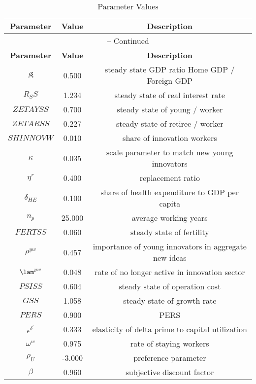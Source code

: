 \begin{center}
\begin{longtable}{ccc}
\caption{Parameter Values}\\%
\toprule%
\multicolumn{1}{c}{\textbf{Parameter}} &
\multicolumn{1}{c}{\textbf{Value}} &
 \multicolumn{1}{c}{\textbf{Description}}\\%
\midrule%
\endfirsthead
\multicolumn{3}{c}{{\tablename} \thetable{} -- Continued}\\%
\midrule%
\multicolumn{1}{c}{\textbf{Parameter}} &
\multicolumn{1}{c}{\textbf{Value}} &
  \multicolumn{1}{c}{\textbf{Description}}\\%
\midrule%
\endhead
${\mathfrak{K}}$ 	 & 	 0.500 	 & 	 steady state GDP ratio \: Home GDP / Foreign GDP \\
${R_SS}$ 	 & 	 1.234 	 & 	 steady state of real interest rate\\
${ZETAYSS}$ 	 & 	 0.700 	 & 	 steady state of young / worker \\
${ZETARSS}$ 	 & 	 0.227 	 & 	 steady state of retiree / worker \\
${SHINNOVW}$ 	 & 	 0.010 	 & 	 share of innovation workers\\
${\kappa}$ 	 & 	 0.035 	 & 	 scale parameter to match new young innovators\\
${\eta^r}$ 	 & 	 0.400 	 & 	 replacement ratio\\
${\delta_{HE}}$ 	 & 	 0.100 	 & 	 share of health expenditure to GDP per capita\\
${n_p}$ 	 & 	 25.000 	 & 	 average working years\\
${FERTSS}$ 	 & 	 0.060 	 & 	 steady state of fertility\\
${\rho^{yw}}$ 	 & 	 0.457 	 & 	 importance of young innovators in aggregate new ideas\\
${\lam^{yw}}$ 	 & 	 0.048 	 & 	 rate of no longer active in innovation sector\\
${PSISS}$ 	 & 	 0.604 	 & 	 steady state of operation cost\\
${GSS}$ 	 & 	 1.058 	 & 	 steady state of growth rate\\
$PERS$ 	 & 	 0.900 	 & 	 PERS\\
${\epsilon^{\delta^{\prime}}}$ 	 & 	 0.333 	 & 	 elasticity of delta prime to capital utilization\\
${\omega^w}$ 	 & 	 0.975 	 & 	 rate of staying workers\\
${\rho_U}$ 	 & 	 -3.000 	 & 	 preference parameter\\
${\beta}$ 	 & 	 0.960 	 & 	 subjective discount factor\\

\end{longtable}
\end{center}
